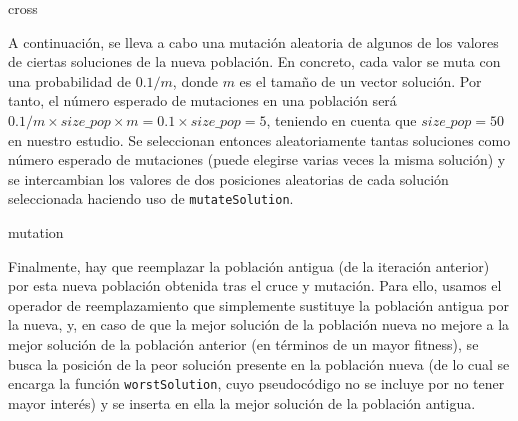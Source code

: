 \documentclass[10pt,a4paper]{article}
\begin{document}
\begin{algorithm}[H]
	\DontPrintSemicolon
	\caption{{\sc cross} }
\end{algorithm}

A continuación, se lleva a cabo una mutación aleatoria de algunos de los valores de ciertas soluciones de la nueva población. En concreto, cada valor se muta con una probabilidad de $0.1/m$, donde $m$ es el tamaño de un vector solución. Por tanto, el número esperado de mutaciones en una población será $0.1/m \times size\_pop \times m=0.1 \times size\_pop = 5$, teniendo en cuenta que $size\_pop=50$ en nuestro estudio. Se seleccionan entonces aleatoriamente tantas soluciones como número esperado de mutaciones (puede elegirse varias veces la misma solución) y se intercambian los valores de dos posiciones aleatorias de cada solución seleccionada haciendo uso de \lstinline|mutateSolution|.

\begin{algorithm}[H]
	\DontPrintSemicolon
	\caption{{\sc mutation} }
\end{algorithm}


Finalmente, hay que reemplazar la población antigua (de la iteración anterior) por esta nueva población obtenida tras el cruce y mutación. Para ello, usamos el operador de reemplazamiento que simplemente sustituye la población antigua por la nueva, y, en caso de que la mejor solución de la población nueva no mejore a la mejor solución de la población anterior (en términos de un mayor fitness), se busca la posición de la peor solución presente en la población nueva (de lo cual se encarga la función \lstinline|worstSolution|, cuyo pseudocódigo no se incluye por no tener mayor interés) y se inserta en ella la mejor solución de la población antigua. 
\end{document}
